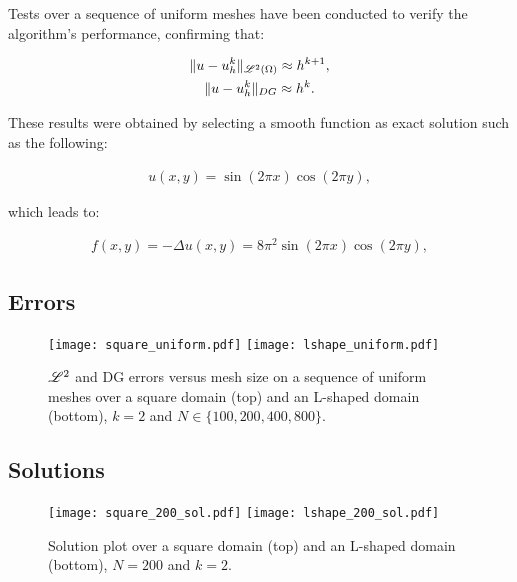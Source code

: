 Tests over a sequence of uniform meshes have been conducted to verify the algorithm's performance, confirming that:

\begin{gather}
    \lVert u - u^k_h \rVert_{\mathscr{L}^2(\Omega)} \approx h^{k + 1}, \\
    \lVert u - u^k_h \rVert_{DG} \approx h^k.
\end{gather}

These results were obtained by selecting a smooth function as exact solution such as the following:

\begin{gather}
    u(x, y) = \sin(2 \pi x) \cos(2 \pi y),
\end{gather}

which leads to:

\begin{gather}
    f(x, y) = -\Delta u(x, y) = 8 \pi^2 \sin(2 \pi x) \cos(2 \pi y),
\end{gather}

\newpage
\subsection{Errors}

\begin{figure}[!ht]
	\centering
	\texttt{[image: square\_uniform.pdf]}
    \texttt{[image: lshape\_uniform.pdf]}
	\caption{$\mathscr{L}^2$ and DG errors versus mesh size on a sequence of uniform meshes over a square domain (top) and an L-shaped domain (bottom), $k = 2$ and $N \in \{100, 200, 400, 800\}$.}
\end{figure}

\newpage
\subsection{Solutions}

\begin{figure}[!ht]
	\centering
	\texttt{[image: square\_200\_sol.pdf]}
    \texttt{[image: lshape\_200\_sol.pdf]}
	\caption{Solution plot over a square domain (top) and an L-shaped domain (bottom), $N = 200$ and $k = 2$.}
\end{figure}